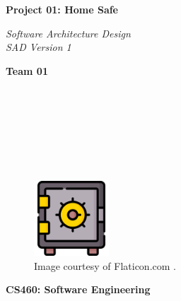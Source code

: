 \documentclass{article}
\begin{document}
\begin{titlepage}
\begin{center}
\vspace*{1cm}

\Huge
\textbf{Project 01: Home Safe}

\vspace{0.5cm}
\Large
\textit{Software Architecture Design} \\
\textit{SAD Version 1}

\vspace{1cm}

\textbf{Team 01}

\vspace{0.5cm}

 \\
 \\
 \\
 \\
 \\
 \\

\vspace{1cm}

\begin{figure}[h]
    \centering
    \includegraphics[width=0.25\textwidth]{docs/figs/safe.png}
    \caption*{Image courtesy of Flaticon.com \cite{flaticonSafeDeposit}.}
    \label{fig:safeIcon}
\end{figure}

\vspace{7cm}

\Large
\textbf{CS460: Software Engineering} \\

\end{center}
\end{titlepage}

\newpage

\tableofcontents

\newpage
\end{document}
